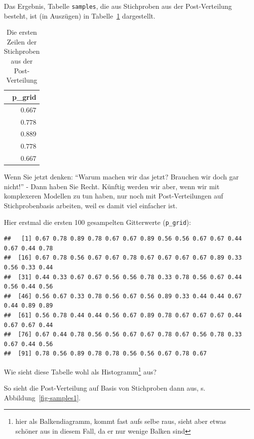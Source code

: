 \documentclass[
  a4paper,
  DIV=11]{scrreprt}
\theoremstyle{definition}
\theoremstyle{remark}
\begin{document}
Das Ergebnis, Tabelle \texttt{samples}, die aus Stichproben aus der
Post-Verteilung besteht, ist (in Auszügen) in
Tabelle~\ref{tbl-postsample1} dargestellt.

\hypertarget{tbl-postsample1}{}
\begin{longtable}{r}
\caption{\label{tbl-postsample1}Die ersten Zeilen der Stichproben aus der Post-Verteilung }\tabularnewline

\toprule
p\_grid \\ 
\midrule
$0.667$ \\ 
$0.778$ \\ 
$0.889$ \\ 
$0.778$ \\ 
$0.667$ \\ 
\bottomrule
\end{longtable}

Wenn Sie jetzt denken: ``Warum machen wir das jetzt? Brauchen wir doch
gar nicht!'' - Dann haben Sie Recht. Künftig werden wir aber, wenn wir
mit komplexeren Modellen zu tun haben, nur noch mit Post-Verteilungen
auf Stichprobenbasis arbeiten, weil es damit viel einfacher ist.

Hier erstmal die ersten 100 gesampelten Gitterwerte (\texttt{p\_grid}):

\begin{verbatim}
##   [1] 0.67 0.78 0.89 0.78 0.67 0.67 0.89 0.56 0.56 0.67 0.67 0.44 0.67 0.44 0.78
##  [16] 0.67 0.78 0.56 0.67 0.67 0.78 0.67 0.67 0.67 0.67 0.89 0.33 0.56 0.33 0.44
##  [31] 0.44 0.33 0.67 0.67 0.56 0.56 0.78 0.33 0.78 0.56 0.67 0.44 0.56 0.44 0.56
##  [46] 0.56 0.67 0.33 0.78 0.56 0.67 0.56 0.89 0.33 0.44 0.44 0.67 0.44 0.89 0.89
##  [61] 0.56 0.78 0.44 0.44 0.56 0.67 0.89 0.78 0.67 0.67 0.67 0.44 0.67 0.67 0.44
##  [76] 0.67 0.44 0.78 0.56 0.56 0.67 0.67 0.78 0.67 0.56 0.78 0.33 0.67 0.44 0.56
##  [91] 0.78 0.56 0.89 0.78 0.78 0.56 0.56 0.67 0.78 0.67
\end{verbatim}

Wie sieht diese Tabelle wohl als Histogramm\footnote{hier als
  Balkendiagramm, kommt fast aufs selbe raus, sieht aber etwas schöner
  aus in diesem Fall, da er nur wenige Balken sind} aus?

So sieht die Post-Verteilung auf Basis von Stichproben dann aus, s.
Abbildung~\ref{fig-samples1}.
\end{document}
